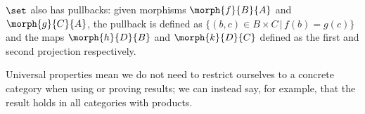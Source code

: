\begin{example}
    \(\set\) also has pullbacks: given morphisms \(\morph{f}{B}{A}\) and
    \(\morph{g}{C}{A}\), the pullback is defined as
    \(\{(b,c) \in B \times C \,|\, f(b) = g(c)\}\) and the maps
    \(\morph{h}{D}{B}\) and \(\morph{k}{D}{C}\) defined as the first and second
    projection respectively.
\end{example}

Universal properties mean we do not need to restrict ourselves to a
concrete category when using or proving results; we can instead say, for
example, that the result holds in all categories with products.